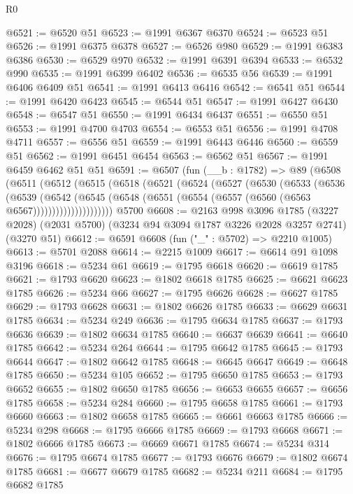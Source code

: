 \begin{lexlean}{R0}
\begin{coremodule}
@6521 := @6520 @51
@6523 := @1991 @6367 @6370
@6524 := @6523 @51
@6526 := @1991 @6375 @6378
@6527 := @6526 @980
@6529 := @1991 @6383 @6386
@6530 := @6529 @970
@6532 := @1991 @6391 @6394
@6533 := @6532 @990
@6535 := @1991 @6399 @6402
@6536 := @6535 @56
@6539 := @1991 @6406 @6409 @51
@6541 := @1991 @6413 @6416
@6542 := @6541 @51
@6544 := @1991 @6420 @6423
@6545 := @6544 @51
@6547 := @1991 @6427 @6430
@6548 := @6547 @51
@6550 := @1991 @6434 @6437
@6551 := @6550 @51
@6553 := @1991 @4700 @4703
@6554 := @6553 @51
@6556 := @1991 @4708 @4711
@6557 := @6556 @51
@6559 := @1991 @6443 @6446
@6560 := @6559 @51
@6562 := @1991 @6451 @6454
@6563 := @6562 @51
@6567 := @1991 @6459 @6462 @51 @51
@6591 := @6507
    (fun (__b : @1782) =>
    @89
      (@6508
        (@6511
          (@6512
            (@6515
              (@6518
                (@6521
                  (@6524
                    (@6527
                      (@6530
                        (@6533
                          (@6536
                            (@6539
                              (@6542
                                (@6545
                                  (@6548
                                    (@6551 (@6554 (@6557 (@6560 (@6563 @6567)))))))))))))))))))))
    @5700
@6608 := @2163
    @998
    @3096
    @1785
    (@3227 @2028)
    (@2031 @5700)
    (@3234 @94 @3094 @1787 @3226 @2028 @3257 @2741)
    (@3270 @51)
@6612 := @6591 @6608 (fun ("_" : @5702) => @2210 @1005)
@6613 := @5701 @2088
@6614 := @2215 @1009
@6617 := @6614 @91 @1098 @3196
@6618 := @5234 @61
@6619 := @1795 @6618
@6620 := @6619 @1785
@6621 := @1793 @6620
@6623 := @1802 @6618 @1785
@6625 := @6621 @6623 @1785
@6626 := @5234 @66
@6627 := @1795 @6626
@6628 := @6627 @1785
@6629 := @1793 @6628
@6631 := @1802 @6626 @1785
@6633 := @6629 @6631 @1785
@6634 := @5234 @249
@6636 := @1795 @6634 @1785
@6637 := @1793 @6636
@6639 := @1802 @6634 @1785
@6640 := @6637 @6639
@6641 := @6640 @1785
@6642 := @5234 @264
@6644 := @1795 @6642 @1785
@6645 := @1793 @6644
@6647 := @1802 @6642 @1785
@6648 := @6645 @6647
@6649 := @6648 @1785
@6650 := @5234 @105
@6652 := @1795 @6650 @1785
@6653 := @1793 @6652
@6655 := @1802 @6650 @1785
@6656 := @6653 @6655
@6657 := @6656 @1785
@6658 := @5234 @284
@6660 := @1795 @6658 @1785
@6661 := @1793 @6660
@6663 := @1802 @6658 @1785
@6665 := @6661 @6663 @1785
@6666 := @5234 @298
@6668 := @1795 @6666 @1785
@6669 := @1793 @6668
@6671 := @1802 @6666 @1785
@6673 := @6669 @6671 @1785
@6674 := @5234 @314
@6676 := @1795 @6674 @1785
@6677 := @1793 @6676
@6679 := @1802 @6674 @1785
@6681 := @6677 @6679 @1785
@6682 := @5234 @211
@6684 := @1795 @6682 @1785

\end{coremodule}
\end{lexlean}
